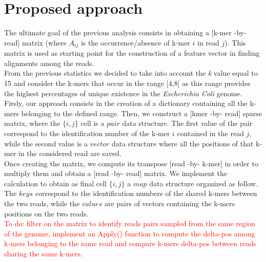 \documentclass[11pt]{article}
\newcommand\myworries[1]{\textcolor{red}{#1}}
\begin{document}

\section{Proposed approach}\label{approach}

The ultimate goal of the previous analysis consists in obtaining a [k-mer -by- read] matrix (where $A_{ij}$ is the occurrence/absence of k-mer $i$ in read $j$).
This matrix is used as starting point for the construction of a feature vector in finding alignments among the reads.\\
From the previous statistics we decided to take into account the \emph{k} value equal to 15 and consider the k-mers that occur in the range [4,8] as this range provides the highest percentages of unique existence in the \emph{Escherichia Coli} genome.\\
Firsly, our approach consists in the creation of a dictionary containing all the k-mers belonging to the defined range.
Then, we construct a [kmer -by- read] sparse matrix, where the ${\{i,j\}}$ cell is a $pair$ data structure.
The first value of the pair correspond to the identification number of the k-mer $i$ contained in the read $j$, while the second value is a $vector$ data structure where all the positions of that k-mer in the considered read are saved.\\
Once creating the matrix, we compute its transpose [read -by- k-mer] in order to multiply them and obtain a [read -by- read] matrix.
We implement the calculation to obtain as final cell ${\{i,j\}}$ a $map$ data structure organized as follow.
The $keys$ correspond to the identification numbers of the shared k-mers between the two reads, while the $values$ are pairs of vectors containing the k-mers positions on the two reads.\\
\myworries{To do: filter on the matrix to identify reads pairs sampled from the same region of the genome, implement an Apply() function to compute the delta-pos among k-mers belonging to the same read and compare k-mers delta-pos between reads sharing the same k-mers.}
\end{document}
